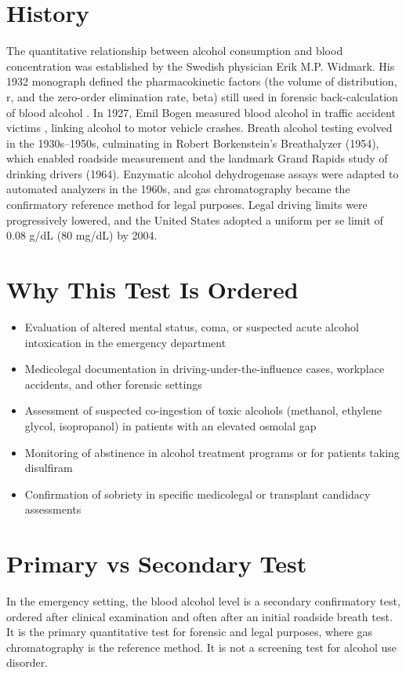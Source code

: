 \section*{History}
The quantitative relationship between alcohol consumption and blood concentration was established by the Swedish physician Erik M.P. Widmark. His 1932 monograph defined the pharmacokinetic factors (the volume of distribution, r, and the zero-order elimination rate, beta) still used in forensic back-calculation of blood alcohol \cite{jones2010evidence}. In 1927, Emil Bogen measured blood alcohol in traffic accident victims \cite{bogen1927human}, linking alcohol to motor vehicle crashes. Breath alcohol testing evolved in the 1930s--1950s, culminating in Robert Borkenstein's Breathalyzer (1954), which enabled roadside measurement and the landmark Grand Rapids study of drinking drivers (1964). Enzymatic alcohol dehydrogenase assays were adapted to automated analyzers in the 1960s, and gas chromatography became the confirmatory reference method for legal purposes. Legal driving limits were progressively lowered, and the United States adopted a uniform per se limit of 0.08 g/dL (80 mg/dL) by 2004.
\section*{Why This Test Is Ordered}
\begin{itemize}
  \item Evaluation of altered mental status, coma, or suspected acute alcohol intoxication in the emergency department
  \item Medicolegal documentation in driving-under-the-influence cases, workplace accidents, and other forensic settings
  \item Assessment of suspected co-ingestion of toxic alcohols (methanol, ethylene glycol, isopropanol) in patients with an elevated osmolal gap
  \item Monitoring of abstinence in alcohol treatment programs or for patients taking disulfiram
  \item Confirmation of sobriety in specific medicolegal or transplant candidacy assessments
\end{itemize}
\section*{Primary vs Secondary Test}
In the emergency setting, the blood alcohol level is a secondary confirmatory test, ordered after clinical examination and often after an initial roadside breath test. It is the primary quantitative test for forensic and legal purposes, where gas chromatography is the reference method. It is not a screening test for alcohol use disorder.
